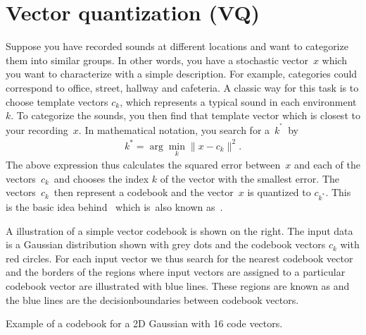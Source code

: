 \documentclass[letterpaper,10pt,english]{jupyterBook}
\begin{document}
\section{Vector quantization (VQ)}
\label{\detokenize{Modelling/Vector_quantization_VQ:vector-quantization-vq}}\label{\detokenize{Modelling/Vector_quantization_VQ::doc}}
\sphinxAtStartPar
Suppose you have recorded sounds at different locations and want to
categorize them into similar groups. In other words, you have a
stochastic vector \(x\) which you want to characterize with a simple
description. For example, categories could correspond to office, street,
hallway and cafeteria. A classic way for this task is to choose template
vectors \(c_{k}\), which represents a typical sound in each
environment \(k\). To categorize the sounds, you then find that template
vector which is closest to your recording \(x\). In mathematical notation,
you search for a \(k^{^*}\) by
\begin{equation*}
\begin{split} k^* = \arg\min_k \|x-c_k\|^2. \end{split}
\end{equation*}
\sphinxAtStartPar
The above expression thus calculates the squared error between \(x \) and
each of the vectors \(c_{k}\) and chooses the index \(k \) of the
vector with the smallest error. The vectors \(c_{k}\) then
represent a codebook and the vector \(x\) is quantized to
\(c_{k^*}\). This is the basic idea behind 
which is also known as .

\sphinxAtStartPar
A illustration of a simple vector codebook is shown on the right. The
input data is a Gaussian distribution shown with grey dots and the
codebook vectors \(c_{k}\) with red circles. For each input vector
we thus search for the nearest codebook vector and the borders of the
regions where input vectors are assigned to a particular codebook vector
are illustrated with blue lines. These regions are known as  and the blue
lines are the decision\sphinxhyphen{}boundaries between codebook vectors.

\sphinxAtStartPar
{}

\sphinxAtStartPar
Example of a codebook for a 2D Gaussian with 16 code vectors.
\end{document}
